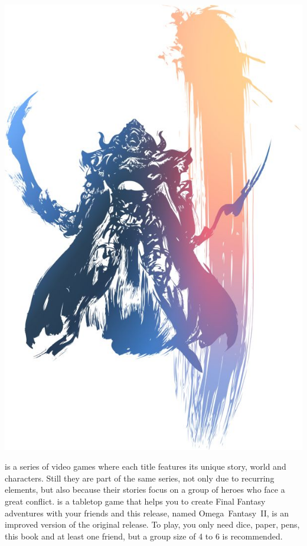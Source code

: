%
%
\begin{center} \includegraphics[width=\columnwidth]{./art/images/ff12.jpg} \end{center}
%
 is a series of video games where each title features its unique story, world and characters.
Still they are part of the same series, not only due to recurring elements, but also because their stories focus on a group of heroes who face a great conflict.
 is a tabletop game that helps you to create Final Fantasy adventures with your friends and this release, named Omega~Fantasy~II, is an improved version of the original release.
To play, you only need dice, paper, pens, this book and at least one friend, but a group size of 4 to 6 is recommended.
